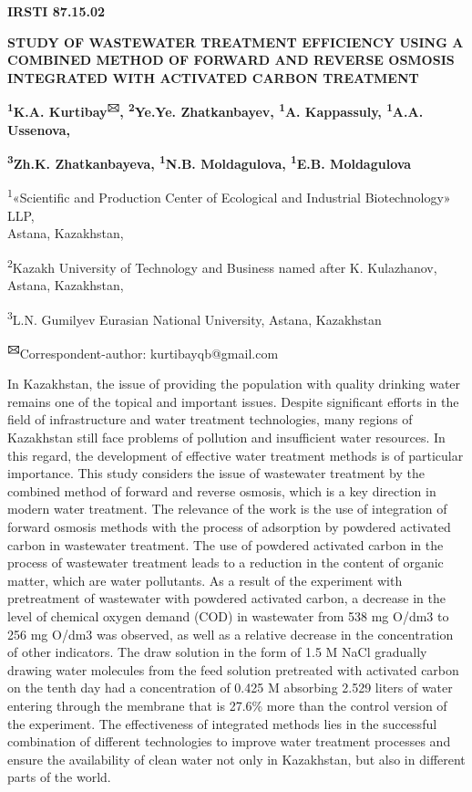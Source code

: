 \newpage
{\bfseries IRSTI 87.15.02}

{\bfseries STUDY OF WASTEWATER TREATMENT EFFICIENCY USING A COMBINED METHOD
OF FORWARD AND REVERSE OSMOSIS INTEGRATED WITH ACTIVATED CARBON
TREATMENT}

{\bfseries \textsuperscript{1}K.A. Kurtibay\textsuperscript{🖂},
\textsuperscript{2}Ye.Ye. Zhatkanbayev, \textsuperscript{1}A.
Kappassuly, \textsuperscript{1}A.A. Ussenova,}

{\bfseries \textsuperscript{3}Zh.K. Zhatkanbayeva, \textsuperscript{1}N.B.
Moldagulova, \textsuperscript{1}E.B. Moldagulova}

\textsuperscript{1}«Scientific and Production Center of Ecological and
Industrial Biotechnology» LLP,\\
Astana, Kazakhstan,

\textsuperscript{2}Kazakh University of Technology and Business named
after K. Kulazhanov,\\
Astana, Kazakhstan,

\textsuperscript{3}L.N. Gumilyev Eurasian National University, Astana,
Kazakhstan

{\bfseries \textsuperscript{🖂}}Correspondent-author: kurtibayqb@gmail.com

In Kazakhstan, the issue of providing the population with quality
drinking water remains one of the topical and important issues. Despite
significant efforts in the field of infrastructure and water treatment
technologies, many regions of Kazakhstan still face problems of
pollution and insufficient water resources. In this regard, the
development of effective water treatment methods is of particular
importance. This study considers the issue of wastewater treatment by
the combined method of forward and reverse osmosis, which is a key
direction in modern water treatment. The relevance of the work is the
use of integration of forward osmosis methods with the process of
adsorption by powdered activated carbon in wastewater treatment. The use
of powdered activated carbon in the process of wastewater treatment
leads to a reduction in the content of organic matter, which are water
pollutants. As a result of the experiment with pretreatment of
wastewater with powdered activated carbon, a decrease in the level of
chemical oxygen demand (COD) in wastewater from 538 mg O/dm3 to 256 mg
O/dm3 was observed, as well as a relative decrease in the concentration
of other indicators. The draw solution in the form of 1.5 M NaCl
gradually drawing water molecules from the feed solution pretreated with
activated carbon on the tenth day had a concentration of 0.425 M
absorbing 2.529 liters of water entering through the membrane that is
27.6\% more than the control version of the experiment. The
effectiveness of integrated methods lies in the successful combination
of different technologies to improve water treatment processes and
ensure the availability of clean water not only in Kazakhstan, but also
in different parts of the world.

